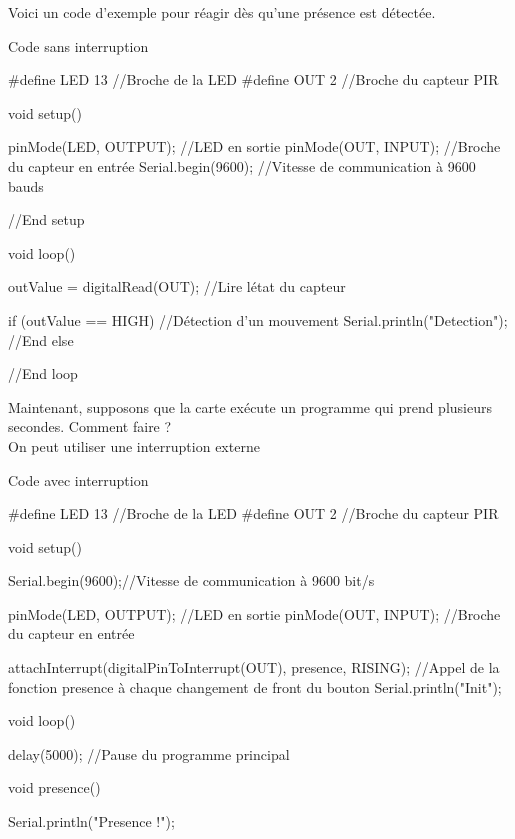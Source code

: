 Voici un code d'exemple pour réagir dès qu'une présence est détectée.

\begin{Cpp}{Code sans interruption}

#define LED 13    //Broche de la LED
#define OUT 2     //Broche du capteur PIR
    
void setup() 
{
      
  pinMode(LED, OUTPUT); //LED en sortie
  pinMode(OUT, INPUT);  //Broche du capteur en entrée
  Serial.begin(9600);   //Vitesse de communication à 9600 bauds

}//End setup
    
void loop(){
    
  outValue = digitalRead(OUT);          //Lire létat du capteur
        
    if (outValue == HIGH)                 //Détection d'un mouvement
    {
        Serial.println("Detection");
    }//End else
}//End loop
\end{Cpp}


Maintenant, supposons que la carte exécute un programme qui prend plusieurs secondes. Comment faire ?\\

On peut utiliser une interruption externe

\begin{Cpp}{Code avec interruption}
 

    #define LED 13    //Broche de la LED
    #define OUT 2     //Broche du capteur PIR
       
    void setup() {
      
      Serial.begin(9600);//Vitesse de communication à 9600 bit/s
      
      pinMode(LED, OUTPUT); //LED en sortie
      pinMode(OUT, INPUT);  //Broche du capteur en entrée
      
      attachInterrupt(digitalPinToInterrupt(OUT), presence, RISING);  //Appel de la fonction presence à chaque changement de front du bouton
      Serial.println("Init");
    }
    
    void loop() {
      
     delay(5000); //Pause du programme principal
      
    }
    
    void presence() {
      
      Serial.println("Presence !");
    }
    
\end{Cpp}




